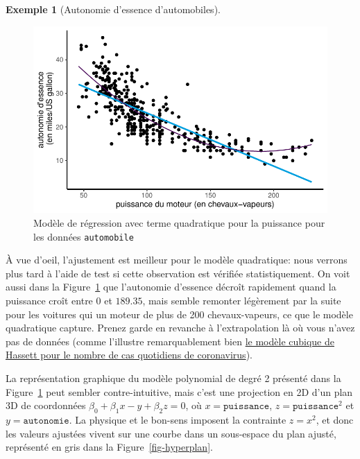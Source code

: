 \documentclass[
  11pt,
  letterpaper,
]{scrbook}
\theoremstyle{definition}
\newtheorem{example}{Exemple}[chapter]
\theoremstyle{remark}
\begin{document}
\begin{example}[Autonomie d'essence
d'automobiles]
\begin{figure}[ht!]
{\centering \includegraphics{rappel-regressionlineaire_files/figure-pdf/fig-autoquad2d-1.pdf}

}

\caption{\label{fig-autoquad2d}Modèle de régression avec terme
quadratique pour la puissance pour les données \texttt{automobile}}

\end{figure}

À vue d'oeil, l'ajustement est meilleur pour le modèle quadratique: nous
verrons plus tard à l'aide de test si cette observation est vérifiée
statistiquement. On voit aussi dans la Figure~\ref{fig-autoquad2d} que
l'autonomie d'essence décroît rapidement quand la puissance croît entre
\(0\) et \(189.35\), mais semble remonter légèrement par la suite pour
les voitures qui un moteur de plus de 200 chevaux-vapeurs, ce que le
modèle quadratique capture. Prenez garde en revanche à l'extrapolation
là où vous n'avez pas de données (comme l'illustre remarquablement bien
\href{https://livefreeordichotomize.com/2020/05/05/model-detective/}{le
modèle cubique de Hassett pour le nombre de cas quotidiens de
coronavirus}).

La représentation graphique du modèle polynomial de degré 2 présenté
dans la Figure~\ref{fig-autoquad2d} peut sembler contre-intuitive, mais
c'est une projection en 2D d'un plan 3D de coordonnées
\(\beta_0 + \beta_1x-y +\beta_2z =0\), où \(x=\texttt{puissance}\),
\(z=\texttt{puissance}^2\) et \(y=\texttt{autonomie}\). La physique et
le bon-sens imposent la contrainte \(z = x^2\), et donc les valeurs
ajustées vivent sur une courbe dans un sous-espace du plan ajusté,
représenté en gris dans la Figure~\ref{fig-hyperplan}.

\begin{figure}[ht!]


\end{figure}
\end{example}
\end{document}
